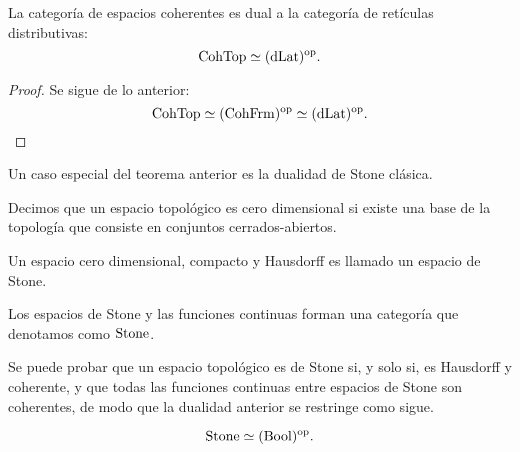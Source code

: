 \begin{theorem}
    La categoría de espacios coherentes es dual
    a la categoría de retículas distributivas:
    \[
        \mathrm{CohTop} \simeq (\mathrm{dLat})^{\mathrm{op}}
    .\]
\end{theorem}
\begin{proof}
    Se sigue de lo anterior:
    \[
        \mathrm{CohTop} \simeq (\mathrm{CohFrm})^{\mathrm{op}} \simeq (\mathrm{dLat})^{\mathrm{op}}
    .\]
\end{proof}

Un caso especial del teorema anterior es
la dualidad de Stone clásica.

\begin{definition}
    Decimos que un espacio topológico es cero dimensional
    si existe una base de la topología que consiste en
    conjuntos cerrados-abiertos.
    
    Un espacio cero dimensional, compacto y Hausdorff es llamado
    un espacio de Stone.
    
    Los espacios de Stone y las funciones continuas forman
    una categoría que denotamos como $\mathrm{Stone}$.
\end{definition}

Se puede probar que un espacio topológico es de Stone
si, y solo si, es Hausdorff y coherente,
y que todas las funciones continuas entre espacios de Stone
son coherentes, de modo que la dualidad anterior
se restringe como sigue.

\begin{theorem}
    \[
        \mathrm{Stone} \simeq (\mathrm{Bool})^{\mathrm{op}}.
    \]
\end{theorem}

